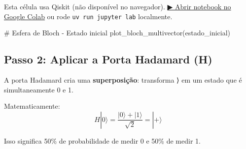 \documentclass[
  brazilian,
]{report}
\newenvironment{Shaded}{\begin{snugshade}}{\end{snugshade}}
\newcommand{\CommentTok}[1]{\textcolor[rgb]{0.37,0.37,0.37}{#1}}
\newcommand{\NormalTok}[1]{\textcolor[rgb]{0.00,0.23,0.31}{#1}}
\begin{document}
\begin{tcolorbox}[enhanced jigsaw, arc=.35mm, bottomrule=.15mm, bottomtitle=1mm, breakable, colback=white, colbacktitle=quarto-callout-warning-color!10!white, colframe=quarto-callout-warning-color-frame, coltitle=black, left=2mm, leftrule=.75mm, opacityback=0, opacitybacktitle=0.6, rightrule=.15mm, title=\textcolor{quarto-callout-warning-color}{\faExclamationTriangle}\hspace{0.5em}{⚛️ Célula Qiskit --- execute no Colab ou localmente}, titlerule=0mm, toprule=.15mm, toptitle=1mm]

Esta célula usa Qiskit (não disponível no navegador).
\href{https://colab.research.google.com/github/maxwellamaral/aula-quantum/blob/main/notebooks/01-intro.ipynb}{▶
Abrir notebook no Google Colab} ou rode \texttt{uv\ run\ jupyter\ lab}
localmente.

\begin{Shaded}
\begin{Highlighting}[]

\CommentTok{\# Esfera de Bloch {-} Estado inicial}
\NormalTok{plot\_bloch\_multivector(estado\_inicial)}
\end{Highlighting}
\end{Shaded}

\end{tcolorbox}

\subsection{Passo 2: Aplicar a Porta Hadamard
(H)}\label{passo-2-aplicar-a-porta-hadamard-h}

A porta Hadamard cria uma \textbf{superposição}: transforma ⟩
em um estado que é simultaneamente 0 e 1.

Matematicamente:
\[H|0\rangle = \frac{|0\rangle + |1\rangle}{\sqrt{2}} = |+\rangle\]

Isso significa 50\% de probabilidade de medir 0 e 50\% de medir 1.
\end{document}
